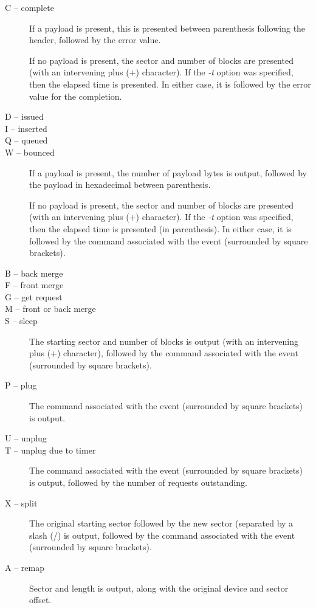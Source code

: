 \documentclass{article}
\begin{document}
\begin{description}
  \item[C -- complete] If a payload is present, this is presented between
  parenthesis following the header, followed by the error value. 

  If no payload is present, the sector and number of blocks are presented
  (with an intervening plus (+) character). If the \emph{-t} option
  was specified, then the elapsed time is presented. In either case,
  it is followed by the error value for the completion.

  \item[D -- issued]
  \item[I -- inserted]
  \item[Q -- queued]
  \item[W -- bounced] If a payload is present, the number of payload bytes
  is output, followed by the payload in hexadecimal between parenthesis.

  If no payload is present, the sector and number of blocks are presented
  (with an intervening plus (+) character). If the \emph{-t} option was
  specified, then the elapsed time is presented (in parenthesis). In
  either case, it is followed by the command associated with the event
  (surrounded by square brackets).

  \item[B -- back merge]
  \item[F -- front merge]
  \item[G -- get request]
  \item[M -- front or back merge]
  \item[S -- sleep] The starting sector and number of blocks is output
  (with an intervening plus (+) character), followed by the command
  associated with the event (surrounded by square brackets).

  \item[P -- plug] The command associated with the event (surrounded by
  square brackets) is output.

  \item[U -- unplug]
  \item[T -- unplug due to timer] The command associated with the event
  (surrounded by square brackets) is output, followed by the number of
  requests outstanding.

  \item[X -- split] The original starting sector followed by the new
  sector (separated by a slash (/) is output, followed by the command
  associated with the event (surrounded by square brackets).

  \item[A -- remap] Sector and length is output, along with the original
  device and sector offset.

\end{description}
\end{document}
